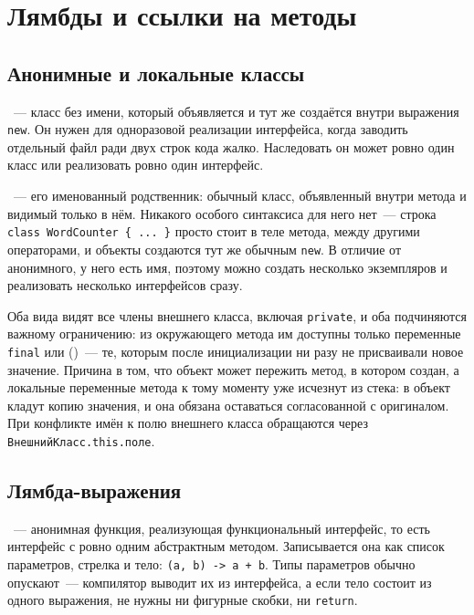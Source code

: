 \section{Лямбды и ссылки на методы}

\subsection{Анонимные и локальные классы}

~--- класс без имени, который объявляется и тут же
создаётся внутри выражения \texttt{new}. Он нужен для одноразовой реализации
интерфейса, когда заводить отдельный файл ради двух строк кода жалко.
Наследовать он может ровно один класс или реализовать ровно один интерфейс.

~--- его именованный родственник: обычный класс,
объявленный внутри метода и видимый только в нём. Никакого особого синтаксиса
для него нет~--- строка \texttt{class WordCounter \{ ... \}} просто стоит в теле
метода, между другими операторами, и объекты создаются тут же обычным
\texttt{new}. В отличие от анонимного, у него есть имя, поэтому можно создать
несколько экземпляров и реализовать несколько интерфейсов сразу.

Оба вида видят все члены внешнего класса, включая \texttt{private}, и оба
подчиняются важному ограничению: из окружающего метода им доступны только
переменные \texttt{final} или 
()~--- те, которым после инициализации ни разу не
присваивали новое значение. Причина в том, что объект может пережить метод, в
котором создан, а локальные переменные метода к тому моменту уже исчезнут из
стека: в объект кладут копию значения, и она обязана оставаться согласованной
с оригиналом. При конфликте имён к полю внешнего класса обращаются через
\texttt{ВнешнийКласс.this.поле}.

\subsection{Лямбда-выражения}

~--- анонимная функция, реализующая функциональный
интерфейс, то есть интерфейс с ровно одним абстрактным методом. Записывается
она как список параметров, стрелка и тело: \texttt{(a, b) -> a + b}. Типы
параметров обычно опускают~--- компилятор выводит их из интерфейса, а если тело
состоит из одного выражения, не нужны ни фигурные скобки, ни \texttt{return}.

